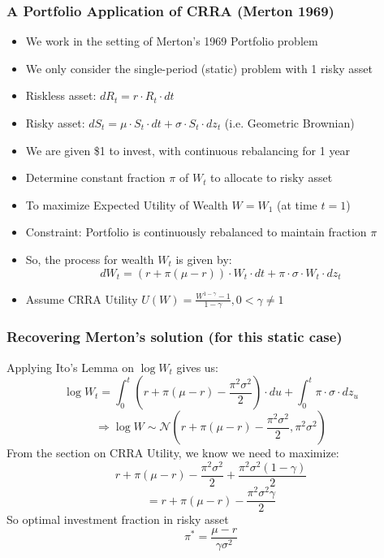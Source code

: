 \documentclass[handout]{beamer}
\begin{document}
\begin{frame}
\frametitle{A Portfolio Application of CRRA (Merton 1969)}
\pause
\begin{itemize}[<+->]
\item We work in the setting of Merton's 1969 Portfolio problem
\item We only consider the single-period (static) problem with 1 risky asset
\item Riskless asset: $dR_t = r \cdot R_t \cdot dt$
\item Risky asset: $dS_t = \mu \cdot S_t \cdot dt + \sigma \cdot S_t \cdot dz_t$ (i.e. Geometric Brownian)
\item We are given \$1 to invest, with continuous rebalancing for 1 year
\item Determine constant fraction $\pi$ of $W_t$ to allocate to risky asset
\item To maximize Expected Utility of Wealth $W = W_1$ (at time $t=1$)
\item Constraint: Portfolio is continuously rebalanced to maintain fraction $\pi$
\item So, the process for wealth $W_t$ is given by:
$$dW_t = (r + \pi (\mu - r)) \cdot W_t \cdot dt + \pi \cdot \sigma \cdot W_t \cdot dz_t$$
\item Assume CRRA Utility $U(W) = \frac {W^{1-\gamma} - 1} {1-\gamma}, 0 < \gamma \neq 1$
\end{itemize}
\end{frame}

\begin{frame}
\frametitle{Recovering Merton's solution (for this static case)}
\pause
Applying Ito's Lemma on $\log W_t$ gives us:
$$\log W_t = \int_0^t (r + \pi (\mu - r) - \frac {\pi^2 \sigma^2} 2) \cdot du + \int_0^t \pi \cdot \sigma \cdot dz_u$$
\pause
$$\Rightarrow \log W \sim \mathcal{N}(r+\pi(\mu -r) - \frac {\pi^2 \sigma^2} 2,  \pi^2 \sigma^2)$$
\pause
From the section on CRRA Utility, we know we need to maximize:
$$r+\pi(\mu -r) - \frac {\pi^2 \sigma^2} 2 + \frac {\pi^2 \sigma^2 (1-\gamma)} 2$$
\pause
$$= r + \pi(\mu - r) - \frac {\pi^2 \sigma^2 \gamma} 2$$
\pause
So optimal investment fraction in risky asset
$$\pi^* = \frac {\mu - r} {\gamma \sigma^2}$$
\end{frame}
\end{document}
